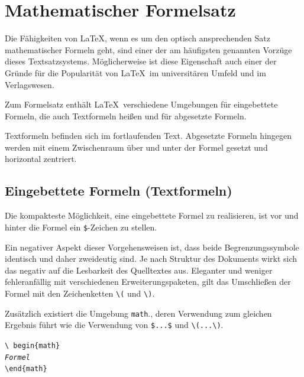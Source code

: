 \documentclass[a4paper,10pt,twoside]{scrbook}
\begin{document}
{\chapter{Mathematischer Formelsatz}
\label{KapitelMathematik}

Die Fähigkeiten von \LaTeX, wenn es um den optisch ansprechenden Satz mathematischer Formeln geht, sind einer der am häufigsten genannten Vorzüge dieses Textsatzsystems. Möglicherweise ist diese Eigenschaft auch einer der Gründe für die Popularität von \LaTeX\ 
im universitären Umfeld und im Verlagswesen.


Zum Formelsatz enthält \LaTeX\ verschiedene Umgebungen für eingebettete Formeln, die auch Textformeln heißen
und für abgesetzte Formeln.

Textformeln befinden sich im fortlaufenden Text. Abgesetzte Formeln hingegen werden
mit einem Zwischenraum über und unter der Formel gesetzt und horizontal zentriert.

\section{Eingebettete Formeln (Textformeln)}

Die kompakteste Möglichkeit, eine eingebettete Formel zu realisieren, ist vor und hinter die 
Formel ein \verb!$!-Zeichen zu stellen. 


Ein negativer Aspekt dieser Vorgehensweisen ist, dass
beide Begrenzungssymbole identisch und daher zweideutig sind. 
Je nach Struktur des Dokuments wirkt sich das negativ auf die Lesbarkeit des Quelltextes aus.
Eleganter und weniger fehleranfällig mit verschiedenen Erweiterungspaketen, gilt das 
Umschließen der Formel mit den Zeichenketten \verb!\(! und \verb!\)!.



Zusätzlich existiert die Umgebung \verb!math!., deren Verwendung zum
gleichen Ergebnis führt wie die
Verwendung von \verb!$...$! und \verb!\(...\)!.

\begin{boxedminipage}{\textwidth}
\texttt{\textbackslash
begin\{math\} \\
\textsl{Formel} \\
\textbackslash end\{math\}}
\end{boxedminipage}





}
\end{document}
